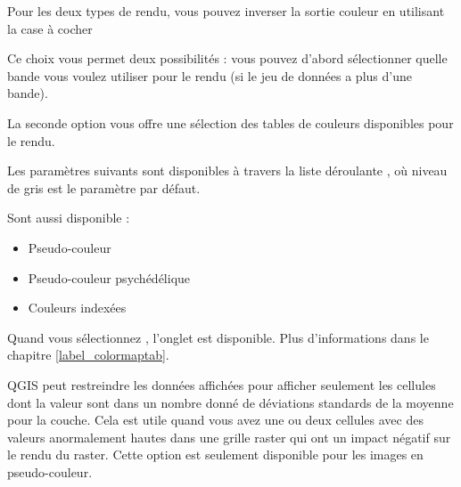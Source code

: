 Pour les deux types de rendu, vous pouvez inverser la sortie couleur en
utilisant la case à cocher 


Ce choix vous permet deux possibilités : vous pouvez d'abord sélectionner
quelle bande vous voulez utiliser pour le rendu (si le jeu de données a plus
d'une bande).

La seconde option vous offre une sélection des tables de couleurs disponibles
pour le rendu.

Les paramètres suivants sont disponibles à travers la liste déroulante
, où niveau de gris est le 
paramètre par défaut.

Sont aussi disponible :
\begin{itemize}
\item Pseudo-couleur
\item Pseudo-couleur psychédélique
\item Couleurs indexées
\end{itemize}

Quand vous sélectionnez , l'onglet
 est disponible. Plus d'informations dans le chapitre
\ref{label_colormaptab}.

QGIS peut restreindre les données affichées pour afficher seulement les
cellules dont la valeur sont dans un nombre donné de déviations standards de
la moyenne pour la couche. Cela est
utile quand vous avez une ou deux cellules avec des valeurs anormalement hautes
dans une grille raster qui ont un impact négatif sur le rendu du raster. Cette
option est seulement disponible pour les images en pseudo-couleur.

